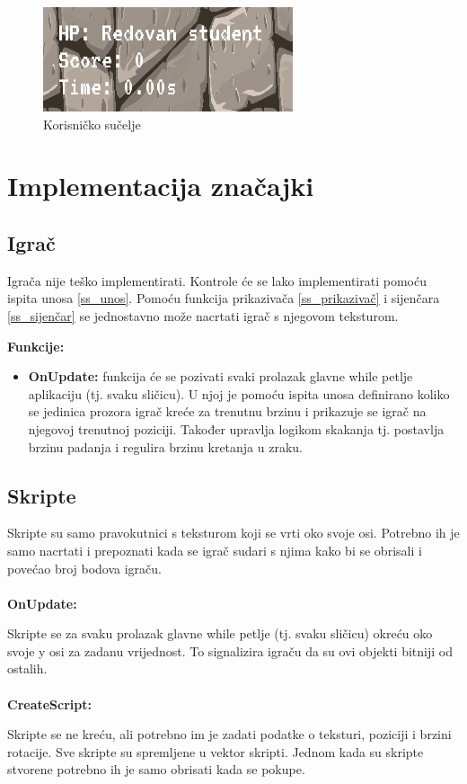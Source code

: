 \documentclass{mathos}
\begin{document}
\begin{figure}[H]
    \centering
    \includegraphics[scale=1.0]{Slike/UIPlatformer.png}
    \caption{Korisničko sučelje}
    \label{im_sučeljePlatformer}
\end{figure}

\section{Implementacija značajki}
\subsection{Igrač}
Igrača nije teško implementirati. Kontrole će se lako implementirati pomoću ispita unosa \ref{ss_unos}. Pomoću funkcija prikazivača \ref{ss_prikazivač} i sijenčara \ref{ss_sijenčar}
se jednostavno može nacrtati igrač s njegovom teksturom.

\textbf{Funkcije:}
\begin{itemize}
    \item \textbf{OnUpdate: } funkcija će se pozivati svaki prolazak glavne while petlje aplikaciju (tj. svaku sličicu). U njoj je pomoću ispita unosa definirano koliko se
          jedinica prozora igrač kreće za trenutnu brzinu i prikazuje se igrač na njegovoj trenutnoj poziciji. Također upravlja logikom skakanja tj. postavlja brzinu padanja i
          regulira brzinu kretanja u zraku.
\end{itemize}

\subsection{Skripte}
Skripte su samo pravokutnici s teksturom koji se vrti oko svoje osi. Potrebno ih je samo nacrtati i prepoznati kada se igrač sudari s njima kako bi se obrisali i povećao broj
bodova igraču.
\\ \\
\textbf{OnUpdate: }

Skripte se za svaku prolazak glavne while petlje (tj. svaku sličicu) okreću oko svoje y osi za zadanu vrijednost. To signalizira igraču da su ovi objekti bitniji od ostalih.
\\ \\
\textbf{CreateScript: }

Skripte se ne kreću, ali potrebno im je zadati podatke o teksturi, poziciji i brzini rotacije. Sve skripte su spremljene u vektor skripti. Jednom kada su skripte stvorene
potrebno ih je samo obrisati kada se pokupe.
\end{document}
